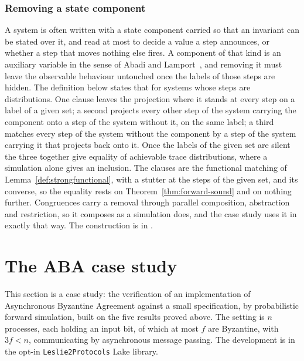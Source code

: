 

\subsection{Removing a state component}

A system is often written with a state component carried so that an invariant can be stated over it, and read at most to decide a value a step announces, or whether a step that moves nothing else fires.
A component of that kind is an auxiliary variable in the sense of Abadi and Lamport~\cite{AL91}, and removing it must leave the observable behaviour untouched once the labels of those steps are hidden.
The definition below states that for systems whose steps are distributions.
One clause leaves the projection where it stands at every step on a label of a given set; a second projects every other step of the system carrying the component onto a step of the system without it, on the same label; a third matches every step of the system without the component by a step of the system carrying it that projects back onto it.
Once the labels of the given set are silent the three together give equality of achievable trace distributions, where a simulation alone gives an inclusion.
The clauses are the functional matching of Lemma~\ref{def:strongfunctional}, with a stutter at the steps of the given set, and its converse, so the equality rests on Theorem~\ref{thm:forward-sound} and on nothing further.
Congruences carry a removal through parallel composition, abstraction and restriction, so it composes as a simulation does, and the case study uses it in exactly that way.
The construction is in .



\chapter{The ABA case study}


This section is a case study: the verification of an implementation of Asynchronous Byzantine Agreement against a small specification, by probabilistic forward simulation, built on the five results proved above.
The setting is $n$ processes, each holding an input bit, of which at most $f$ are Byzantine, with $3f < n$, communicating by asynchronous message passing.
The development is in the opt-in \texttt{Leslie2Protocols} Lake library.


